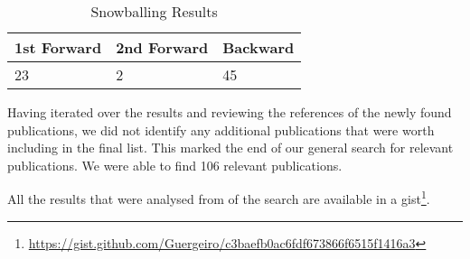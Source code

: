 \begin{table}[!htb] \caption{Snowballing Results} \label{tab:db1-snowballing}
  \begin{center}
    \begin{tabular}[c]{p{8em}|p{8em}|p{8em}}
      \textbf{1st Forward} &
      \textbf{2nd Forward} &
      \textbf{Backward} \\
      \hline{23} &
      {2} &
      {45} \\
    \end{tabular}
  \end{center}
\end{table}

Having iterated over the results and reviewing the references of the newly
found publications, we did not identify any additional publications that were
worth including in the final list. This marked the end of our general search
for relevant publications. We were able to find 106 relevant publications.

All the results that were analysed from of the search are available in a gist\footnote{\url{https://gist.github.com/Guergeiro/c3baefb0ac6fdf673866f6515f1416a3}}.
